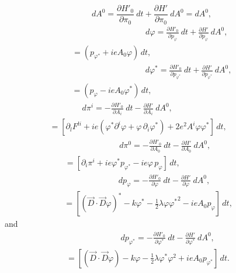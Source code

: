 \documentclass[12pt]{article}
\begin{document}
\begin{equation}\label{29}
dA^{0}=\frac{\partial H'_{0}}{\partial\pi_{0}}\>dt+\frac{\partial
H'}{\partial\pi_{0}}\>dA^0=dA^0,
\end{equation}
\begin{multline}
\quad \quad \quad \quad\qquad\qquad\quad d\varphi=\frac{\partial
H'_{0}}{\partial p_{\varphi}}\>dt+\frac{\partial
H'}{\partial p_{\varphi}}\>dA^0,\\
=(p_{{\varphi}^{\ast}}+ieA_{0}\varphi)\,dt,\quad \quad \quad \quad
\quad \quad \quad \quad \quad \,\,\,\,\,\label{30}
\end{multline}
\begin{multline}
\quad \quad \quad \quad\qquad\qquad\quad
d\varphi^{\ast}=\frac{\partial H'_{0}}{\partial
p_{\varphi^{\ast}}}\>dt+\frac{\partial
H'}{\partial p_{\varphi^{\ast}}}\>dA^0,\\
=(p_{\varphi}-ieA_{0}\varphi^{\ast})\,dt,\quad \quad \quad \quad
\quad \quad \quad \quad \quad \,\,\label{31}
\end{multline}
\begin{multline}
\quad \quad \quad \quad d\pi^{i}=-\frac{\partial H'_{0}}{\partial
A_{i}}\>dt-\frac{\partial H'}{\partial A_{i}}\>dA^0,\\
=[\partial_{l}F^{li}+ie(\varphi^{\ast}\partial^{i}\varphi+\varphi\,\partial_{i}\varphi^{\ast})+2e^{2}A^{i}\varphi\varphi^{\ast}]\,dt,\quad
\quad \quad \,\,\label{32}
\end{multline}
\begin{multline}
\quad \quad \quad \quad \quad \quad\,\,\,\,
d\pi^{0}=-\frac{\partial H'_{0}}{\partial
A_{0}}\>dt-\frac{\partial H'}{\partial A_{0}}\>dA^0,\\
=[\partial_{i}\pi^{i}+ie\varphi^{\ast}p_{{\varphi}^{\ast}}-ie\varphi\,p_{\varphi}]\,dt,\quad
\quad \quad \quad \quad \quad \quad\, \label{33}
\end{multline}
\begin{multline}
\quad \quad \quad \quad \quad \quad\,\,\,\,
dp_{\varphi}=-\frac{\partial H'_{0}}{\partial
\varphi}\>dt-\frac{\partial H'}{\partial \varphi}\>dA^0,\\
=[(\overrightarrow{D}\cdot\overrightarrow{D}\varphi)^{\ast}-k\varphi^{\ast}-\frac{1}{2}\lambda\varphi{\varphi^{\ast}}^2-ieA_{0}p_{\varphi}]\,dt,
 \,\,\,\,\,\label{34}
\end{multline}
and
\begin{multline}
\quad \quad \quad \quad \quad \quad\,\,\,\,
dp_{\varphi^{\ast}}=-\frac{\partial H'_{0}}{\partial
\varphi^{\ast}}\>dt-\frac{\partial H'}{\partial \varphi^{\ast}}\>dA^0,\\
=[(\overrightarrow{D}\cdot\overrightarrow{D}\varphi)-k\varphi-\frac{1}{2}\lambda\varphi^{\ast}{\varphi^2}+ieA_{0}p_{\varphi^{\ast}}]\,dt.
\quad \label{35}
\end{multline}
\end{document}
